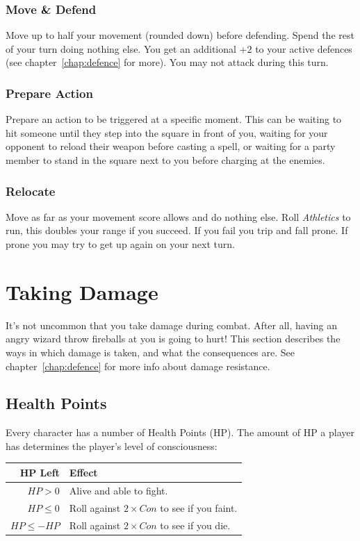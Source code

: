 \subsubsection{Move \& Defend}
Move up to half your movement (rounded down) before defending. 
Spend the rest of your turn doing nothing else. 
You get an additional $+2$ to your active defences (see chapter~\ref{chap:defence} for more). 
You may not attack during this turn.

\subsubsection{Prepare Action}
Prepare an action to be triggered at a specific moment.
This can be waiting to hit someone until they step into the square in front of you, waiting for your opponent to reload their weapon before casting a spell, or waiting for a party member to stand in the square next to you before charging at the enemies.

\subsubsection{Relocate}
Move as far as your movement score allows and do nothing else.
Roll \textit{Athletics} to run, this doubles your range if you succeed.
If you fail you trip and fall prone.
If prone you may try to get up again on your next turn.

\section{Taking Damage}
It's not uncommon that you take damage during combat.
After all, having an angry wizard throw fireballs at you is going to hurt!
This section describes the ways in which damage is taken, and what the consequences are.
See chapter~\ref{chap:defence} for more info about damage resistance.

\subsection{Health Points}
Every character has a number of Health Points (HP).
The amount of HP a player has determines the player's level of consciousness:

\begin{center}
  \begin{tabular}{r | l}
    \textbf{HP Left} & \textbf{Effect} \\\hline
    $HP > 0$         & Alive and able to fight. \\
    $HP \leq 0$      & Roll against $2 \times Con$ to see if you faint. \\
    $HP \leq -HP$    & Roll against $2 \times Con$ to see if you die.
  \end{tabular}
\end{center}

